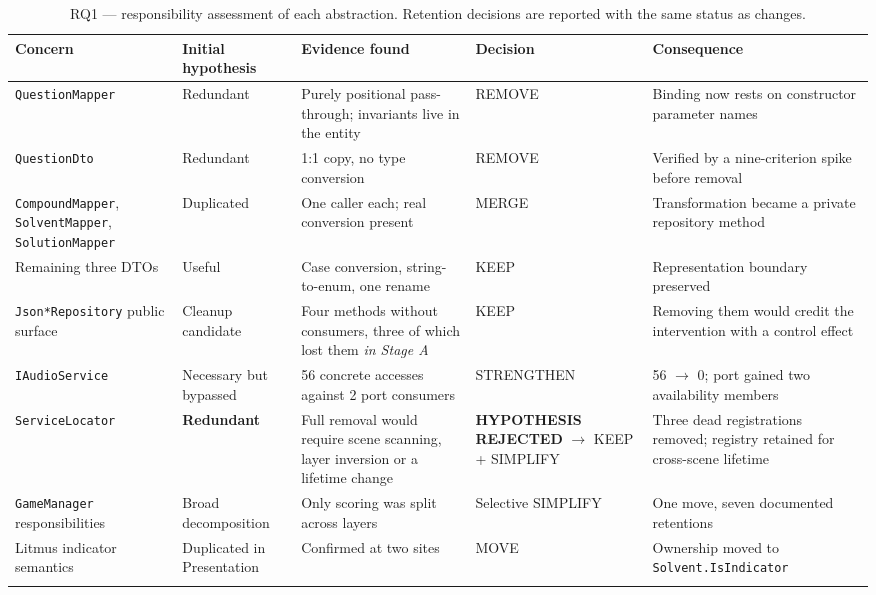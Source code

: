 \documentclass{sbc2019}%
\begin{document}
\begin{table}[t]
\centering
\caption{RQ1 --- responsibility assessment of each abstraction. Retention
decisions are reported with the same status as changes.}\label{tab:rq1}
\small
\begin{tabular}{p{}p{}p{}p{}p{}}
\toprule
\textbf{Concern} & \textbf{Initial hypothesis} & \textbf{Evidence found} & \textbf{Decision} & \textbf{Consequence} \\
\midrule
\texttt{QuestionMapper} & Redundant & Purely positional pass-through; invariants live in the entity & REMOVE & Binding now rests on constructor parameter names \\
\addlinespace
\texttt{QuestionDto} & Redundant & 1:1 copy, no type conversion & REMOVE & Verified by a nine-criterion spike before removal \\
\addlinespace
\texttt{CompoundMapper}, \texttt{SolventMapper}, \texttt{SolutionMapper} & Duplicated & One caller each; real conversion present & MERGE & Transformation became a private repository method \\
\addlinespace
Remaining three DTOs & Useful & Case conversion, string-to-enum, one rename & KEEP & Representation boundary preserved \\
\addlinespace
\texttt{Json*Repository} public surface & Cleanup candidate & Four methods without consumers, three of which lost them \emph{in Stage A} & KEEP & Removing them would credit the intervention with a control effect \\
\addlinespace
\texttt{IAudioService} & Necessary but bypassed & 56 concrete accesses against 2 port consumers & STRENGTHEN & 56 $\rightarrow$ 0; port gained two availability members \\
\addlinespace
\texttt{ServiceLocator} & \textbf{Redundant} & Full removal would require scene scanning, layer inversion or a lifetime change & \textbf{HYPOTHESIS REJECTED} $\rightarrow$ KEEP + SIMPLIFY & Three dead registrations removed; registry retained for cross-scene lifetime \\
\addlinespace
\texttt{GameManager} responsibilities & Broad decomposition & Only scoring was split across layers & Selective SIMPLIFY & One move, seven documented retentions \\
\addlinespace
Litmus indicator semantics & Duplicated in Presentation & Confirmed at two sites & MOVE & Ownership moved to \texttt{Solvent.\allowbreak{}IsIndicator} \\
\addlinespace

\end{tabular}
\end{table}
\end{document}
